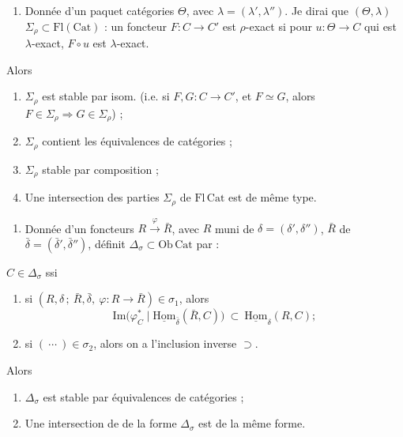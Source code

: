 \documentclass[11pt,a4paper]{article}
\begin{document}
\begin{enumerate}
  \item[$(1)$] Donnée d'un paquet   catégories $\Theta$, avec
    $\lambda = (\lambda', \lambda'')$. Je dirai que \struck{\ill{}}
    $(\Theta, \lambda)$  $\Sigma_\rho \subset \mathrm{Fl}(\mathrm{Cat})$ : un
    foncteur $F : C \to C'$ est $\rho$-exact  si pour \struck{\ill{}} 
    $u : \Theta \to C$ qui est $\lambda$-exact, $F \circ u$ est $\lambda$-exact.
\end{enumerate}
Alors
\begin{enumerate}
  \item[a)] $\Sigma_\rho$ est stable par isom. (i.e. si $F, G : C \to C'$, et
    $F \simeq G$, alors $F \in \Sigma_\rho \Rightarrow G \in \Sigma_\rho$) ;
  \item[b)] $\Sigma_\rho$ contient les équivalences de catégories ;
  \item[c)] $\Sigma_\rho$ stable par composition ;
  \item[d)] Une intersection des parties $\Sigma_\rho$ de
    $\mathrm{Fl}\,\mathrm{Cat}$ est de  même type.
\end{enumerate}

\begin{enumerate}
  \item[$(2)$] Donnée d'un 
      foncteurs
    $R \xrightarrow{\ \varphi\ } \bar{R}$, avec \struck{\ill{}} $R$ muni de
    $\delta = (\delta', \delta'')$, $\bar{R}$ de
    $\bar\delta = (\bar\delta', \bar\delta'')$,
    \struck{\ill{}} \ill{} définit $\Delta_\sigma \subset \mathrm{Ob}\,\mathrm{Cat}$
    par :
\end{enumerate}

$C \in \Delta_\sigma$ ssi
\begin{enumerate}
  \item[a)] si $(R, \delta\,;\ \bar{R}, \bar\delta,\ \varphi : R \to \bar{R})
    \in \sigma_1$, alors
    \[
      \mathrm{Im}\bigl(\varphi^{*}_C \mid \underline{\mathrm{Hom}}_{\bar\delta}(\bar{R}, C)\bigr)
      \ \subset\ \underline{\mathrm{Hom}}_{\delta}(R, C) ;
    \]
  \item[b)] si $(\ \cdots\ ) \in \sigma_2$, alors on a l'inclusion inverse
    $\supset$.
\end{enumerate}
Alors
\begin{enumerate}
  \item[a)] $\Delta_\sigma$ est stable par équivalences de catégories ;
  \item[b)] Une intersection de  \ill{} de la forme
    $\Delta_\sigma$ est de la même forme.
\end{enumerate}
\end{document}
